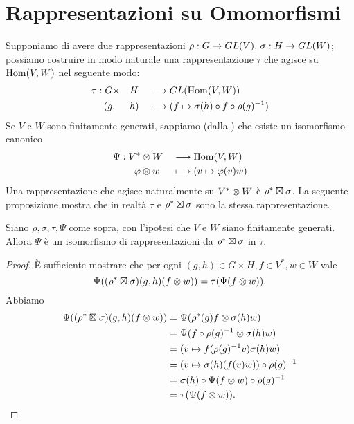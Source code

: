 \section{Rappresentazioni su Omomorfismi}

Supponiamo di avere due rappresentazioni $\rho:G\to GL(V),\,\allowbreak\sigma:H\to GL(W)$; possiamo costruire in modo naturale una rappresentazione $\tau$ che agisce su $\operatorname{Hom}(V,W)$ nel seguente modo:
\begin{alignat*}{3}
\tau:G&\times&& H&&\longrightarrow GL(\operatorname{Hom}(V,W))\\
(g&,&&h)&&\longmapsto (f\mapsto\sigma(h)\circ f\circ \rho(g)^{-1})
\end{alignat*}
Se $V$ e $W$ sono finitamente generati, sappiamo (dalla ) che esiste un isomorfismo canonico
\begin{alignat*}{2}
\Psi:V^*&\otimes W&&\longrightarrow\operatorname{Hom}(V,W)\\
\varphi&\otimes w&&\longmapsto(v\mapsto \varphi(v)w)
\end{alignat*}
Una rappresentazione che agisce naturalmente su $V^*\otimes W$ è $\rho^*\boxtimes\sigma$. La seguente proposizione mostra che in realtà $\tau$ e $\rho^*\boxtimes\sigma$ sono la stessa rappresentazione.

\begin{proposition}
Siano $\rho\comma\sigma\comma\tau\comma\Psi$ come sopra, con l'ipotesi che $V$ e $W$ siano finitamente generati. Allora $\Psi$ è un isomorfismo di rappresentazioni da $\rho^*\boxtimes\sigma$ in $\tau$.
\end{proposition}
\begin{proof}
È sufficiente mostrare che per ogni $(g,h)\in G\times H\comma f\in V^*\comma w\in W$ vale
$$
\Psi((\rho^*\boxtimes\sigma)(g,h)(f\otimes w))=\tau(\Psi(f\otimes w)).
$$
Abbiamo
\begin{align*}
\Psi((\rho^*\boxtimes\sigma)(g,h)(f\otimes w))&=\Psi(\rho^*(g)f\otimes\sigma(h)w)\\
&=\Psi(f\circ\rho(g)^{-1}\otimes\sigma(h)w)\\
&=(v\mapsto f(\rho(g)^{-1}v)\sigma(h)w)\\
&=(v\mapsto \sigma(h)(f(v)w))\circ \rho(g)^{-1}\\
&=\sigma(h)\circ\Psi(f\otimes w)\circ\rho(g)^{-1}\\
&=\tau(\Psi(f\otimes w)).
\end{align*}
\end{proof}

